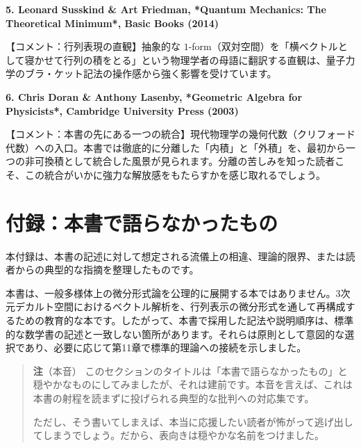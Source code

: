 \documentclass[a4paper,12pt,openany]{book}
\begin{document}
\textbf{5. Leonard Susskind \& Art Friedman, *Quantum Mechanics: The Theoretical Minimum*, Basic Books (2014)}

【コメント：行列表現の直観】抽象的な
\(1\)-form（双対空間）を「横ベクトルとして寝かせて行列の積をとる」という物理学者の母語に翻訳する直観は、量子力学のブラ・ケット記法の操作感から強く影響を受けています。

\par\vspace{0.35em}\par

\textbf{6. Chris Doran \& Anthony Lasenby, *Geometric Algebra for Physicists*, Cambridge University Press (2003)}

【コメント：本書の先にある一つの統合】現代物理学の幾何代数（クリフォード代数）への入口。本書では徹底的に分離した「内積」と「外積」を、最初から一つの非可換積として統合した風景が見られます。分離の苦しみを知った読者こそ、この統合がいかに強力な解放感をもたらすかを感じ取れるでしょう。

\newpage

\hypertarget{ux4ed8ux9332ux672cux66f8ux3067ux8a9eux3089ux306aux304bux3063ux305fux3082ux306e}{%
\chapter{付録：本書で語らなかったもの}\label{ux4ed8ux9332ux672cux66f8ux3067ux8a9eux3089ux306aux304bux3063ux305fux3082ux306e}}

本付録は、本書の記述に対して想定される流儀上の相違、理論的限界、または読者からの典型的な指摘を整理したものです。

本書は、一般多様体上の微分形式論を公理的に展開する本ではありません。3次元デカルト空間におけるベクトル解析を、行列表示の微分形式を通して再構成するための教育的な本です。したがって、本書で採用した記法や説明順序は、標準的な数学書の記述と一致しない箇所があります。それらは原則として意図的な選択であり、必要に応じて第11章で標準的理論への接続を示しました。

\begin{quote}
\textbf{注}（本音）
このセクションのタイトルは「本書で語らなかったもの」と穏やかなものにしてみましたが、それは建前です。本音を言えば、これは本書の射程を読まずに投げられる典型的な批判への対応集です。

ただし、そう書いてしまえば、本当に応援したい読者が怖がって逃げ出してしまうでしょう。だから、表向きは穏やかな名前をつけました。
\end{quote}
\end{document}
